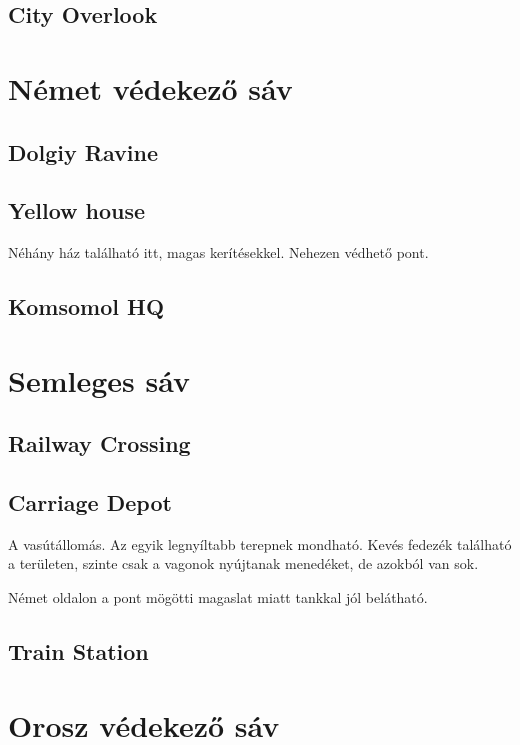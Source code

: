 \subsection{City Overlook}

\section{Német védekező sáv}
\subsection{Dolgiy Ravine}

\subsection{Yellow house}
Néhány ház található itt, magas kerítésekkel. Nehezen védhető pont.

\subsection{Komsomol HQ}

\section{Semleges sáv}
\subsection{Railway Crossing}

\subsection{Carriage Depot}
A vasútállomás. Az egyik legnyíltabb terepnek mondható. Kevés fedezék található a területen, szinte csak a vagonok nyújtanak menedéket, de azokból van sok. 

Német oldalon a pont mögötti magaslat miatt tankkal jól belátható.

\subsection{Train Station}

\section{Orosz védekező sáv}

